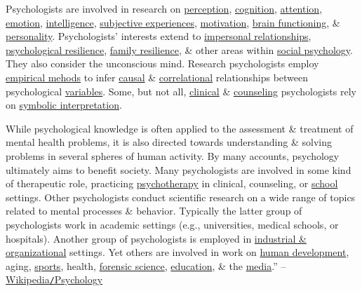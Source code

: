 \documentclass[oneside]{book}
\numberwithin{equation}{section}
\begin{document}
Psychologists are involved in research on \href{https://en.wikipedia.org/wiki/Perception}{perception}, \href{https://en.wikipedia.org/wiki/Cognition}{cognition}, \href{https://en.wikipedia.org/wiki/Attention}{attention}, \href{https://en.wikipedia.org/wiki/Emotion}{emotion}, \href{https://en.wikipedia.org/wiki/Intelligence}{intelligence}, \href{https://en.wikipedia.org/wiki/Phenomenology_(psychology)}{subjective experiences}, \href{https://en.wikipedia.org/wiki/Motivation}{motivation}, \href{https://en.wikipedia.org/wiki/Human_brain#Function}{brain functioning}, \& \href{https://en.wikipedia.org/wiki/Personality_psychology}{personality}. Psychologists' interests extend to \href{https://en.wikipedia.org/wiki/Interpersonal_relationship}{impersonal relationships}, \href{https://en.wikipedia.org/wiki/Psychological_resilience}{psychological resilience}, \href{https://en.wikipedia.org/wiki/Family_resilience}{family resilience}, \& other areas within \href{https://en.wikipedia.org/wiki/Social_psychology}{social psychology}. They also consider the unconscious mind. Research psychologists employ \href{https://en.wikipedia.org/wiki/Empirical_research}{empirical mehods} to infer \href{https://en.wikipedia.org/wiki/Causality}{causal} \& \href{https://en.wikipedia.org/wiki/Correlation}{correlational} relationships between psychological \href{https://en.wikipedia.org/wiki/Dependent_and_independent_variables}{variables}. Some, but not all, \href{https://en.wikipedia.org/wiki/Clinical_psychology}{clinical} \& \href{https://en.wikipedia.org/wiki/Counseling_psychology}{counseling} psychologists rely on \href{https://en.wikipedia.org/wiki/Hermeneutics#Psychology_and_cognitive_science}{symbolic interpretation}.

While psychological knowledge is often applied to the assessment \& treatment of mental health problems, it is also directed towards understanding \& solving problems in several spheres of human activity. By many accounts, psychology ultimately aims to benefit society. Many psychologists are involved in some kind of therapeutic role, practicing \href{https://en.wikipedia.org/wiki/Psychotherapy}{psychotherapy} in clinical, counseling, or \href{https://en.wikipedia.org/wiki/School_psychology}{school} settings. Other psychologists conduct scientific research on a wide range of topics related to mental processes \& behavior. Typically the latter group of psychologists work in academic settings (e.g., universities, medical schools, or hospitals). Another group of psychologists is employed in \href{https://en.wikipedia.org/wiki/Industrial_and_organizational_psychology}{industrial \& organizational} settings. Yet others are involved in work on \href{https://en.wikipedia.org/wiki/Developmental_psychology}{human development}, aging, \href{https://en.wikipedia.org/wiki/Sports_psychology}{sports}, health, \href{https://en.wikipedia.org/wiki/Forensic_psychology}{forensic science}, \href{https://en.wikipedia.org/wiki/Educational_psychology}{education}, \& the \href{https://en.wikipedia.org/wiki/Media_psychology}{media}.'' -- \href{https://en.wikipedia.org/wiki/Psychology}{Wikipedia\texttt{/}Psychology}
\end{document}
